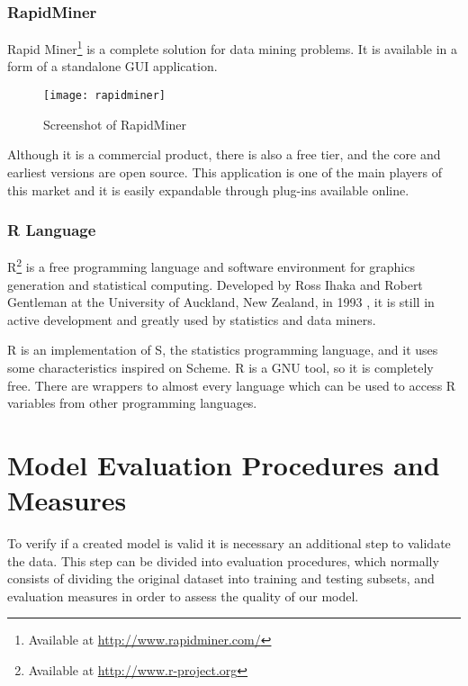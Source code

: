 \subsubsection{RapidMiner}

Rapid Miner\footnote{ Available at \url{http://www.rapidminer.com/}} is a complete solution for data mining problems. It is available in a form of
a standalone GUI application.
\begin{figure}[h]
  \begin{center}
    \leavevmode
    \texttt{[image: rapidminer]}
    \caption{Screenshot of RapidMiner \protect\footnotemark}
    \label{fig:RapidMiner}
  \end{center}
\end{figure}
 Although it is a commercial product, there is also a free tier, and the core and earliest versions are open source. This application
is one of the main players of this market and it is easily expandable through plug-ins available online.

\subsubsection{R Language}
R\footnote{ Available at \url{http://www.r-project.org}} is a free programming language and software environment for graphics generation and statistical computing.
Developed by Ross Ihaka and Robert Gentleman at the University of Auckland, New Zealand, in 1993 \cite{Ihaka98r:past}, it is still in active development and
greatly used by statistics and data miners.

R is an implementation of S, the statistics programming language, and it uses some characteristics inspired on Scheme.
R is a GNU tool, so it is completely free. There are wrappers to almost every language which can be used to access R variables from other programming languages.

\section{Model Evaluation Procedures and Measures}

To verify if a created model is valid it is necessary an additional step to validate the data.
This step can be divided into evaluation procedures, which normally
consists of dividing the original dataset into training and testing subsets, and
evaluation measures in order to assess the quality of our model.

